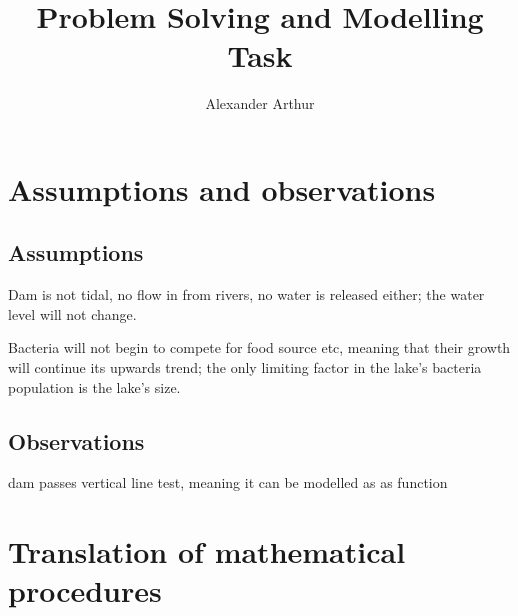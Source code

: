 \documentclass{article}
\title{Problem Solving and Modelling Task}
\author{Alexander Arthur}
\begin{document}
\maketitle
\tableofcontents


\section{Assumptions and observations}
    \subsection{Assumptions}
    
    Dam is not tidal, no flow in from rivers, no water is released either; the
    water level will not change.

    Bacteria will not begin to compete for food source etc, meaning that their
    growth will continue its upwards trend; the only limiting factor in the
    lake's bacteria population is the lake's size.

    \subsection{Observations}

    dam passes vertical line test, meaning it can be modelled as as function


\section{Translation of mathematical procedures}
\end{document}
